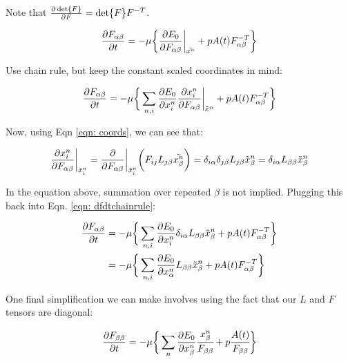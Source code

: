 \documentclass[12pt]{article}
\begin{document}
Note that $\pdv{\det{F}}{F} = \det{F} F^{-T}$.
\begin{center}
\begin{equation}
\label{eqn: dfdtstep1}
\pdv{F_{\alpha \beta}}{t} = -\mu\bigg\{\pdv{E_0}{F_{\alpha\beta}}\bigg\vert_{\tilde{x^n}} + p A(t) F_{\alpha\beta}^{-T}\bigg\}
\end{equation}
\end{center}
Use chain rule, but keep the constant scaled coordinates in mind:
\begin{center}
\begin{equation}
\label{eqn: dfdtchainrule}
\pdv{F_{\alpha \beta}}{t} = -\mu\bigg\{\sum\limits_{n,i} \pdv{E_0}{x_i^n} \pdv{x_i^n}{F_{\alpha\beta}}\bigg\vert_{\tilde{x}^n} + p A(t) F_{\alpha\beta}^{-T}\bigg\}
\end{equation}
\end{center}
Now, using Eqn \ref{eqn: coords}, we can see that:
\begin{center}
\begin{equation}
\pdv{x_i^n}{F_{\alpha \beta}}\bigg\vert_{\tilde{x}_i^n} = \pdv{F_{\alpha \beta}}\bigg\vert_{\tilde{x}_i^n} \bigg(F_{ij} L_{j\beta} \tilde{x_\beta^n} \bigg) = \delta_{i\alpha} \delta_{j\beta} L_{j\beta} \tilde{x}_\beta^n = \delta_{i\alpha} L_{\beta \beta} \tilde{x}_\beta^n 
\end{equation}
\end{center}
In the equation above, summation over repeated $\beta$ is not implied. Plugging this back into Eqn. \ref{eqn: dfdtchainrule}:
\begin{center}
\begin{equation}
\label{eqn: dfdtchainrule}
\begin{split}
\pdv{F_{\alpha \beta}}{t} &= -\mu\bigg\{\sum\limits_{n,i} \pdv{E_0}{x_i^n}  \delta_{i\alpha} L_{\beta \beta} \tilde{x}_\beta^n + p A(t) F_{\alpha\beta}^{-T}\bigg\}\\
&= -\mu\bigg\{\sum\limits_{n,i} \pdv{E_0}{x_\alpha^n}   L_{\beta \beta} \tilde{x}_\beta^n + p A(t) F_{\alpha\beta}^{-T}\bigg\}\\
\end{split}
\end{equation}
\end{center}
One final simplification we can make involves using the fact that our $L$ and $F$ tensors are diagonal:
\begin{center}
\begin{equation}
\label{eqn: final}
\pdv{F_{\beta \beta}}{t} = -\mu\bigg\{\sum\limits_{n} \pdv{E_0}{x_\beta^n}  \cfrac{x_\beta^n}{F_{\beta \beta}} + p \cfrac{A(t)}{F_{\beta\beta}}\bigg\}
\end{equation}
\end{center}
\end{document}
